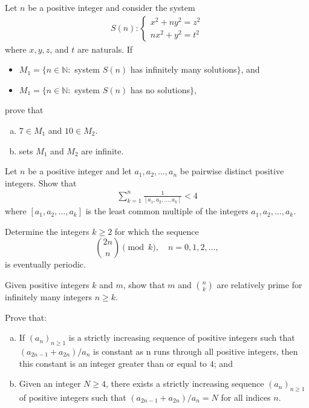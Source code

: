 \documentclass[problems.tex]{subfile}
\begin{document}
	\begin{problem}
		Let $n$ be a positive integer and consider the system
		\begin{align*}
			S(n):\begin{cases}
				x^2+ny^2=z^2\\
				nx^2+y^2=t^2
			\end{cases}
		\end{align*}
		where $x,y,z$, and $t$ are naturals. If
		\begin{itemize}
			\item $M_1=\{n\in\mathbb N:$ system $S(n)$ has infinitely many solutions$\}$, and
			\item $M_1=\{n\in\mathbb N:$ system $S(n)$ has no solutions$\}$,
		\end{itemize}
		prove that
		\begin{enumerate}[(a)]
			\item $7 \in M_1$ and $10 \in M_2$.
			\item sets $M_1$ and $M_2$ are infinite.
		\end{enumerate}
	\end{problem}

	\begin{problem}
		Let $n$ be a positive integer and let $a_1, a_2, \dots, a_n$ be pairwise distinct positive integers. Show that
		\begin{align*}
			\sum_{k=1}^{n} \frac{1}{[a_1, a_2, \dots, a_k]} < 4
		\end{align*}
		where $[a_1, a_2, \dots, a_k]$ is the least common multiple of the integers $a_1, a_2, \dots, a_k$.
	\end{problem}

	\begin{problem}
		Determine the integers $k \geq 2$ for which the sequence$$\binom{2n}{n} \pmod k ,\quad n = 0, 1, 2, \dots,$$ is eventually periodic.
	\end{problem}

	\begin{problem}
		Given positive integers $k$ and $m$, show that $m$ and
		$\binom{n}{k}$ are relatively prime for infinitely many integers $n \geq k$.
	\end{problem}

	\begin{problem}
		Prove that:
		\begin{enumerate}[(a)]
			\item If $(a_n)_{n\geq 1}$ is a strictly increasing sequence of positive integers such that $(a_{2n-1}+a_{2n})/a_n$ is constant as n runs through all positive integers, then this constant is an integer greater than or equal to $4$; and
			\item Given an integer $N \geq 4$, there exists a strictly increasing sequence $(a_n)_{n\geq 1}$ of positive integers such that $(a_{2n-1}+a_{2n})/a_n=N$ for all indices $n$.
		\end{enumerate}
	\end{problem}
\end{document}
